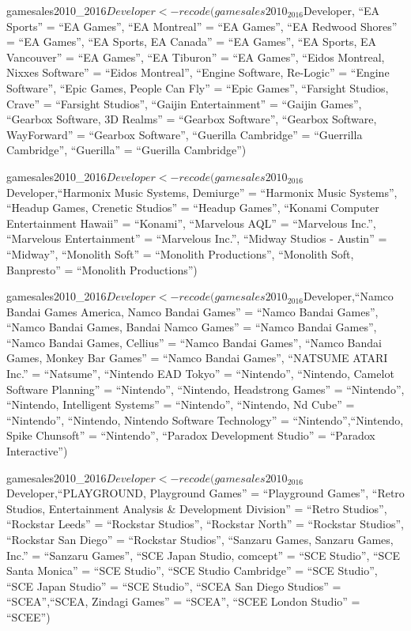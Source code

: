 \documentclass[
]{article}
\begin{document}
gamesales2010\_2016\(Developer <- recode(gamesales2010_2016\)Developer,
``EA Sports'' = ``EA Games'', ``EA Montreal'' = ``EA Games'', ``EA
Redwood Shores'' = ``EA Games'', ``EA Sports, EA Canada'' = ``EA
Games'', ``EA Sports, EA Vancouver'' = ``EA Games'', ``EA Tiburon'' =
``EA Games'', ``Eidos Montreal, Nixxes Software'' = ``Eidos Montreal'',
``Engine Software, Re-Logic'' = ``Engine Software'', ``Epic Games,
People Can Fly'' = ``Epic Games'', ``Farsight Studios, Crave'' =
``Farsight Studios'', ``Gaijin Entertainment'' = ``Gaijin Games'',
``Gearbox Software, 3D Realms'' = ``Gearbox Software'', ``Gearbox
Software, WayForward'' = ``Gearbox Software'', ``Guerilla Cambridge'' =
``Guerrilla Cambridge'', ``Guerilla'' = ``Guerilla Cambridge'')

gamesales2010\_2016\(Developer <- recode(gamesales2010_2016\)Developer,``Harmonix
Music Systems, Demiurge'' = ``Harmonix Music Systems'', ``Headup Games,
Crenetic Studios'' = ``Headup Games'', ``Konami Computer Entertainment
Hawaii'' = ``Konami'', ``Marvelous AQL'' = ``Marvelous Inc.'',
``Marvelous Entertainment'' = ``Marvelous Inc.'', ``Midway Studios -
Austin'' = ``Midway'', ``Monolith Soft'' = ``Monolith Productions'',
``Monolith Soft, Banpresto'' = ``Monolith Productions'')

gamesales2010\_2016\(Developer <- recode(gamesales2010_2016\)Developer,``Namco
Bandai Games America, Namco Bandai Games'' = ``Namco Bandai Games'',
``Namco Bandai Games, Bandai Namco Games'' = ``Namco Bandai Games'',
``Namco Bandai Games, Cellius'' = ``Namco Bandai Games'', ``Namco Bandai
Games, Monkey Bar Games'' = ``Namco Bandai Games'', ``NATSUME ATARI
Inc.'' = ``Natsume'', ``Nintendo EAD Tokyo'' = ``Nintendo'', ``Nintendo,
Camelot Software Planning'' = ``Nintendo'', ``Nintendo, Headstrong
Games'' = ``Nintendo'', ``Nintendo, Intelligent Systems'' =
``Nintendo'', ``Nintendo, Nd Cube'' = ``Nintendo'', ``Nintendo, Nintendo
Software Technology'' = ``Nintendo'',``Nintendo, Spike Chunsoft'' =
``Nintendo'', ``Paradox Development Studio'' = ``Paradox Interactive'')

gamesales2010\_2016\(Developer <- recode(gamesales2010_2016\)Developer,``PLAYGROUND,
Playground Games'' = ``Playground Games'', ``Retro Studios,
Entertainment Analysis \& Development Division'' = ``Retro Studios'',
``Rockstar Leeds'' = ``Rockstar Studios'', ``Rockstar North'' =
``Rockstar Studios'', ``Rockstar San Diego'' = ``Rockstar Studios'',
``Sanzaru Games, Sanzaru Games, Inc.'' = ``Sanzaru Games'', ``SCE Japan
Studio, comcept'' = ``SCE Studio'', ``SCE Santa Monica'' = ``SCE
Studio'', ``SCE Studio Cambridge'' = ``SCE Studio'', ``SCE Japan
Studio'' = ``SCE Studio'', ``SCEA San Diego Studios'' = ``SCEA'',``SCEA,
Zindagi Games'' = ``SCEA'', ``SCEE London Studio'' = ``SCEE'')
\end{document}
